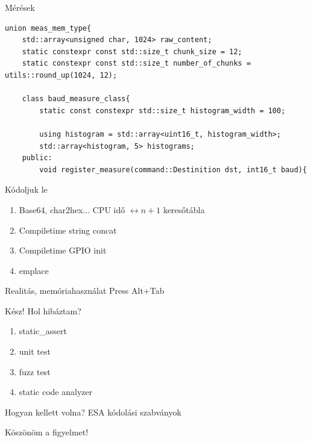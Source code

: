 \documentclass[aspectratio=169,xcolor=dvipsnames]{beamer}
\begin{document}
\begin{frame}[fragile]{Mérések}
\begin{lstlisting}
union meas_mem_type{
    std::array<unsigned char, 1024> raw_content;
    static constexpr const std::size_t chunk_size = 12;
    static constexpr const std::size_t number_of_chunks = utils::round_up(1024, 12);

    class baud_measure_class{
        static const constexpr std::size_t histogram_width = 100;

        using histogram = std::array<uint16_t, histogram_width>;
        std::array<histogram, 5> histograms;
    public:
        void register_measure(command::Destinition dst, int16_t baud){
\end{lstlisting}
\end{frame}

\begin{frame}{Kódoljuk le}
	\begin{enumerate}
		\item Base64, char2hex... CPU idő $\leftrightarrow n+1$ keresőtábla
		\pause
		\item Compiletime string concat
		\item Compiletime GPIO init
		\item emplace
	\end{enumerate}
\end{frame}

\begin{frame}{Realitás, memóriahasználat}
Press Alt+Tab
\end{frame}

\begin{frame}{Kész! Hol hibáztam?}
	\begin{enumerate}
		\item static\_assert
		\item unit test
		\item fuzz test
		\item static code analyzer
	\end{enumerate}
\end{frame}

\begin{frame}{Hogyan kellett volna?}
	ESA kódolási szabványok
\end{frame}




\begin{frame}
    \Huge{\centerline{Köszönöm a figyelmet!}}
\end{frame}
\end{document}
